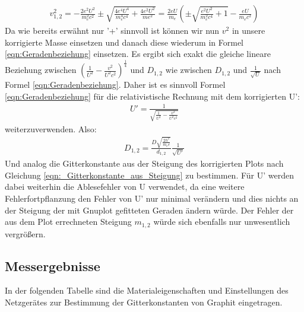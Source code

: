 \documentclass[12pt,a4paper]{article}
\begin{document}
\begin{align}
v^2_{1,2} = -\frac{2e^2U^2}{m_e^2c^2} \pm \sqrt{\frac{4e^4U^4}{m_e^4c^4}+\frac{4e^2U^2}{me^2}} = \frac{2eU}{m_e}\left(\pm\sqrt{\frac{e^2U^2}{m_e^2c^4}+1}-\frac{eU}{m_e c^2}\right)
\end{align}
Da wie bereits erwähnt nur '+' sinnvoll ist können wir nun $v^2$ in unsere korrigierte Masse einsetzen und danach diese wiederum in Formel \ref{eqn:Geradenbeziehung} einsetzen.
Es ergibt sich exakt die gleiche lineare Beziehung zwischen $\left(\frac{1}{U^2}-\frac{v^2}{U^2c^2}\right)^{\frac{1}{4}}$ und $D_{1,2}$ wie zwischen $D_{1,2}$ und $\frac{1}{\sqrt{U}}$ nach Formel \ref{eqn:Geradenbeziehung}.
Daher ist es sinnvoll Formel \ref{eqn:Geradenbeziehung} für die relativistische Rechnung mit dem korrigierten U':
\begin{align}
U' = \frac{1}{\sqrt{\frac{1}{U^2}-\frac{v^2}{U^2c^2}}}
\end{align}
weiterzuverwenden. Also:
\begin{align}
D_{1,2} = \frac{D\sqrt{\frac{2h^2}{m_ee}}}{d_{1,2}}\frac{1}{\sqrt{U'}}
\end{align}
Und analog die Gitterkonstante aus der Steigung des korrigierten Plots nach Gleichung \ref{eqn:_Gitterkonstante_aus_Steigung} zu bestimmen.
Für U' werden dabei weiterhin die Ablesefehler von U verwendet, da eine weitere Fehlerfortpflanzung den Fehler von U' nur minimal verändern und dies nichts an der Steigung der mit Gnuplot gefitteten Geraden ändern würde. Der Fehler der aus dem Plot errechneten Steigung $m_{1,2}$ würde sich ebenfalls nur unwesentlich vergrößern.
\subsection{Messergebnisse}

In der folgenden Tabelle sind die Materialeigenschaften und Einstellungen des Netzgerätes zur Bestimmung der Gitterkonstanten von Graphit eingetragen.
\end{document}
